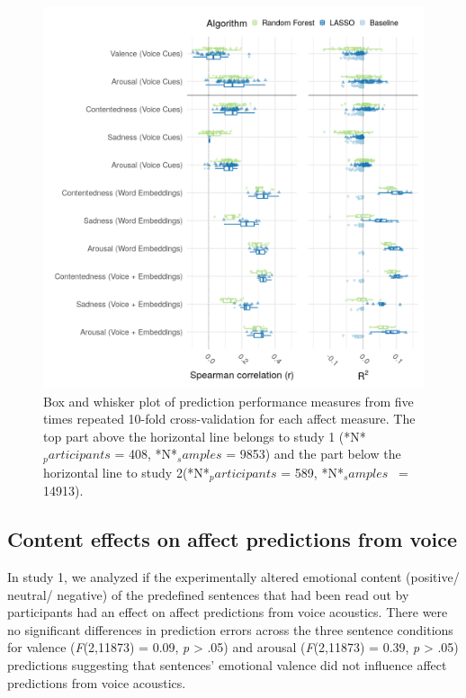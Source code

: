 \documentclass[
  english,
  man,floatsintext]{apa6}
\begin{document}
\begin{figure}

{\centering \includegraphics[width=1\linewidth,height=1\textheight]{../figures/bmr_plot} 

}

\caption[Prediction performance]{Box and whisker plot of prediction performance measures from five times repeated 10-fold cross-validation for each affect measure. The top part above the horizontal line belongs to study 1 (*N*$_participants$ = 408, *N*$_samples$ = 9853) and the part below the horizontal line to study 2(*N*$_participants$ = 589, *N*$_samples$~ = 14913).}\label{fig:predictionoverview}
\end{figure}

\hypertarget{content-effects-on-affect-predictions-from-voice}{%
\subsection{Content effects on affect predictions from voice}\label{content-effects-on-affect-predictions-from-voice}}

In study 1, we analyzed if the experimentally altered emotional content (positive/ neutral/ negative) of the predefined sentences that had been read out by participants had an effect on affect predictions from voice acoustics. There were no significant differences in prediction errors across the three sentence conditions for valence (\emph{F}(2,11873) = 0.09,
\emph{p} \textgreater{} .05) and arousal (\emph{F}(2,11873) = 0.39,
\emph{p} \textgreater{} .05) predictions suggesting that sentences' emotional valence did not influence affect predictions from voice acoustics.
\end{document}
